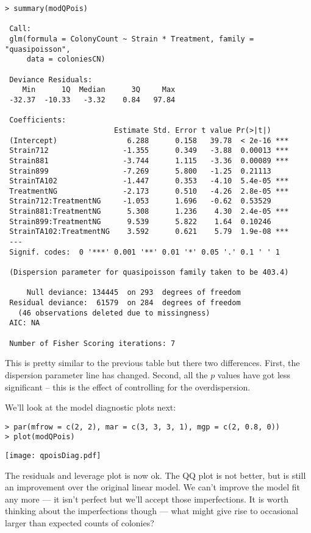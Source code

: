 \begin{lstlisting}
> summary(modQPois) 

 Call:
 glm(formula = ColonyCount ~ Strain * Treatment, family = "quasipoisson", 
     data = coloniesCN)
 
 Deviance Residuals: 
    Min      1Q  Median      3Q     Max  
 -32.37  -10.33   -3.32    0.84   97.84  
 
 Coefficients:
                         Estimate Std. Error t value Pr(>|t|)    
 (Intercept)                6.288      0.158   39.78  < 2e-16 ***
 Strain712                 -1.355      0.349   -3.88  0.00013 ***
 Strain881                 -3.744      1.115   -3.36  0.00089 ***
 Strain899                 -7.269      5.800   -1.25  0.21113    
 StrainTA102               -1.447      0.353   -4.10  5.4e-05 ***
 TreatmentNG               -2.173      0.510   -4.26  2.8e-05 ***
 Strain712:TreatmentNG     -1.053      1.696   -0.62  0.53529    
 Strain881:TreatmentNG      5.308      1.236    4.30  2.4e-05 ***
 Strain899:TreatmentNG      9.539      5.822    1.64  0.10246    
 StrainTA102:TreatmentNG    3.592      0.621    5.79  1.9e-08 ***
 ---
 Signif. codes:  0 '***' 0.001 '**' 0.01 '*' 0.05 '.' 0.1 ' ' 1 
 
 (Dispersion parameter for quasipoisson family taken to be 403.4)
 
     Null deviance: 134445  on 293  degrees of freedom
 Residual deviance:  61579  on 284  degrees of freedom
   (46 observations deleted due to missingness)
 AIC: NA
 
 Number of Fisher Scoring iterations: 7 
\end{lstlisting}

This is pretty similar to the previous table but there two differences. 
First, the dispersion parameter line has changed. Second, all the $p$ 
values have got less significant -- this is the effect of controlling 
for the overdispersion. 

We'll look at the model diagnostic plots next:

\begin{lstlisting}
> par(mfrow = c(2, 2), mar = c(3, 3, 3, 1), mgp = c(2, 0.8, 0))
> plot(modQPois)	
\end{lstlisting}

\begin{center}
	\texttt{[image: qpoisDiag.pdf]} 
\end{center}

The residuals and leverage plot is now ok. The QQ plot is not better, 
but is still an improvement over the original linear model. We can't 
improve the model fit any more ---  it isn't perfect but we'll accept 
those imperfections. It is worth thinking about the imperfections 
though --- what might give rise to occasional larger than expected 
counts of colonies?

